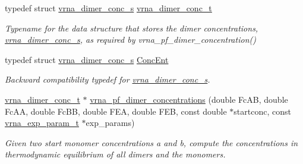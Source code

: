 \begin{DoxyCompactItemize}
\item 
\mbox{\label{group__pf__cofold_gac48c2723444ecfdceafcfd525ca98322}} 
typedef struct \mbox{\hyperlink{structvrna__dimer__conc__s}{vrna\+\_\+dimer\+\_\+conc\+\_\+s}} \mbox{\hyperlink{group__pf__cofold_gac48c2723444ecfdceafcfd525ca98322}{vrna\+\_\+dimer\+\_\+conc\+\_\+t}}
\begin{DoxyCompactList}\small\item\em Typename for the data structure that stores the dimer concentrations, \mbox{\hyperlink{structvrna__dimer__conc__s}{vrna\+\_\+dimer\+\_\+conc\+\_\+s}}, as required by vrna\+\_\+pf\+\_\+dimer\+\_\+concentration() \end{DoxyCompactList}\item 
\mbox{\label{group__pf__cofold_ga46244c7adf5040580291c45b465f4efa}} 
typedef struct \mbox{\hyperlink{structvrna__dimer__conc__s}{vrna\+\_\+dimer\+\_\+conc\+\_\+s}} \mbox{\hyperlink{group__pf__cofold_ga46244c7adf5040580291c45b465f4efa}{Conc\+Ent}}
\begin{DoxyCompactList}\small\item\em Backward compatibility typedef for \mbox{\hyperlink{structvrna__dimer__conc__s}{vrna\+\_\+dimer\+\_\+conc\+\_\+s}}. \end{DoxyCompactList}\item 
\mbox{\hyperlink{group__pf__cofold_gac48c2723444ecfdceafcfd525ca98322}{vrna\+\_\+dimer\+\_\+conc\+\_\+t}} $\ast$ \mbox{\hyperlink{group__pf__cofold_ga83b8d5d0f7875d6d5013b208f23e3356}{vrna\+\_\+pf\+\_\+dimer\+\_\+concentrations}} (double Fc\+AB, double Fc\+AA, double Fc\+BB, double F\+EA, double F\+EB, const double $\ast$startconc, const \mbox{\hyperlink{group__energy__parameters_ga01d8b92fe734df8d79a6169482c7d8d8}{vrna\+\_\+exp\+\_\+param\+\_\+t}} $\ast$exp\+\_\+params)
\begin{DoxyCompactList}\small\item\em Given two start monomer concentrations a and b, compute the concentrations in thermodynamic equilibrium of all dimers and the monomers. \end{DoxyCompactList}\end{DoxyCompactItemize}
